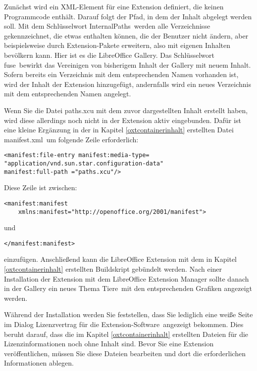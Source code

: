 \documentclass[a4paper,10pt,pagesize,titlepage]{scrbook}
\begin{document}
Zunächst wird ein XML-Element für eine Extension definiert, die keinen Programmcode enthält. Darauf folgt der Pfad, in dem der Inhalt abgelegt werden soll. Mit dem Schlüsselwort \glqq InternalPaths\grqq~werden alle Verzeichnisse gekennzeichnet, die etwas enthalten können, die der Benutzer nicht ändern, aber beispielsweise durch Extension-Pakete erweitern, also mit eigenen Inhalten bevölkern kann. Hier ist es die LibreOffice Gallery. Das Schlüsselwort \glqq fuse\grqq~bewirkt das Vereinigen von bisherigem Inhalt der Gallery mit neuem Inhalt. Sofern bereits ein Verzeichnis mit dem entsprechenden Namen vorhanden ist, wird der Inhalt der Extension hinzugefügt, andernfalls wird ein neues Verzeichnis mit dem entsprechenden Namen angelegt.

Wenn Sie die Datei paths.xcu mit dem zuvor dargestellten Inhalt erstellt haben, wird diese allerdings noch nicht in der Extension aktiv eingebunden. Dafür ist eine kleine Ergänzung in der in Kapitel \ref{oxtcontainerinhalt} erstellten Datei \glqq manifest.xml\grqq~um folgende Zeile erforderlich:
\begin{lstlisting}
<manifest:file-entry manifest:media-type=
"application/vnd.sun.star.configuration-data"  
manifest:full-path ="paths.xcu"/>
\end{lstlisting}  
Diese Zeile ist zwischen:
\begin{lstlisting}
<manifest:manifest 
    xmlns:manifest="http://openoffice.org/2001/manifest">
\end{lstlisting}

und

\begin{lstlisting}
</manifest:manifest>
\end{lstlisting}
einzufügen. Anschließend kann die LibreOffice Extension mit dem in Kapitel \ref{oxtcontainerinhalt} erstellten Buildskript gebündelt werden. Nach einer Installation der Extension mit dem LibreOffice Extension Manager sollte danach in der Gallery ein neues Thema \glqq Tiere\grqq~mit den entsprechenden Grafiken angezeigt werden.

Während der Installation werden Sie feststellen, dass Sie lediglich eine weiße Seite im Dialog \glqq Lizenzvertrag für die Extension-Software\grqq~angezeigt bekommen. Dies beruht darauf, dass die im Kapitel \ref{oxtcontainerinhalt} erstellten Dateien für die Lizenzinformationen noch ohne Inhalt sind. Bevor Sie eine Extension veröffentlichen, müssen Sie diese Dateien bearbeiten und dort die erforderlichen Informationen ablegen.
\end{document}

